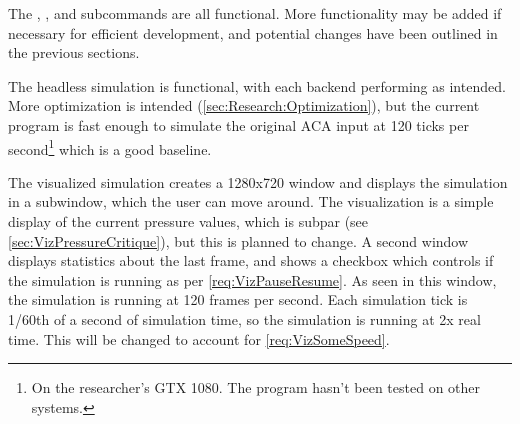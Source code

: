 The , , and  subcommands are all functional.
More functionality may be added if necessary for efficient development, and potential changes have been outlined in the previous sections.

The  headless simulation is functional, with each backend performing as intended. More optimization is intended (\cref{sec:Research:Optimization}), but the current program is fast enough to simulate the original ACA input at 120 ticks per second\footnote{On the researcher's GTX 1080. The program hasn't been tested on other systems.} which is a good baseline.


The visualized simulation creates a 1280x720 window and displays the simulation in a subwindow, which the user can move around.
The visualization is a simple display of the current pressure values, which is subpar (see \cref{sec:VizPressureCritique}), but this is planned to change.
A second window displays statistics about the last frame, and shows a checkbox which controls if the simulation is running as per \cref{req:VizPauseResume}.
As seen in this window, the simulation is running at 120 frames per second.
Each simulation tick is 1/60th of a second of simulation time, so the simulation is running at 2x real time.
This will be changed to account for \cref{req:VizSomeSpeed}.

